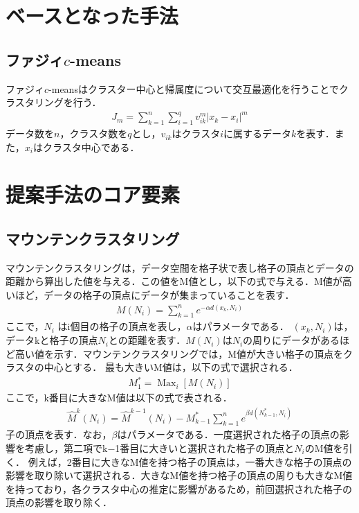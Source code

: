 \documentclass[10pt,onecolumn]{jsarticle}
\begin{document}
\section{ベースとなった手法}
\subsection{ファジィ$c$-means}
ファジィ$c$-meansはクラスター中心と帰属度について交互最適化を行うことでクラスタリングを行う．
\begin{align}
	J_{m}=\sum_{k=1}^{n} \sum_{i=1}^{q} v_{i k}^{m}\left|x_{k}-x_{i}\right|^{m}
\end{align}
データ数を$n$，クラスタ数を$q$とし，$v_{ik}$はクラスタ$i$に属するデータ$k$を表す．また，$x_i$はクラスタ中心である．

\section{提案手法のコア要素}
\subsection{マウンテンクラスタリング}
マウンテンクラスタリングは，データ空間を格子状で表し格子の頂点とデータの距離から算出した値を与える．この値をM値とし，以下の式で与える．M値が高いほど，データの格子の頂点にデータが集まっていることを表す．
\begin{align}
	M\left(N_{i}\right)=\sum_{k=1}^{n} e^{-\alpha d\left(x_{k}, N_{i}\right)}
\end{align}
ここで，$N_i$ はi個目の格子の頂点を表し，$\alpha$はパラメータである．
$(x_k, N_i)$は，データkと格子の頂点$N_i$との距離を表す．$M(N_{i})$は$N_i$の周りにデータがあるほど高い値を示す．マウンテンクラスタリングでは，M値が大きい格子の頂点をクラスタの中心とする．
最も大きいM値は，以下の式で選択される．
\begin{align}
	M_{1}^{*}=\operatorname{Max}_{i}\left[M\left(N_{i}\right)\right]
\end{align}
ここで，k番目に大きなM値は以下の式で表される．
\begin{align}
	\widehat{M}^{k}\left(N_{i}\right)=\widehat{M}^{k-1}\left(N_{i}\right)-M_{k-1}^{*} \sum_{k=1}^{n} e^{\beta d\left(N_{k-1}^{*}, N_{i}\right)}
\end{align}
子の頂点を表す．なお，$\beta$はパラメータである．一度選択された格子の頂点の影響を考慮し，第二項でk−1番目に大きいと選択された格子の頂点と$N_i$のM値を引く．
例えば，2番目に大きなM値を持つ格子の頂点は，一番大きな格子の頂点の影響を取り除いて選択される．大きなM値を持つ格子の頂点の周りも大きなM値を持っており，各クラスタ中心の推定に影響があるため，前回選択された格子の頂点の影響を取り除く．
\end{document}

